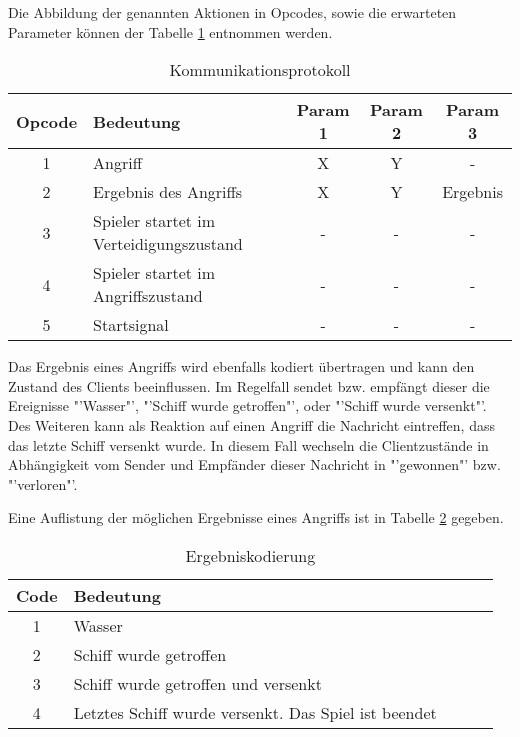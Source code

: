 Die Abbildung der genannten Aktionen in Opcodes, sowie die erwarteten Parameter können der Tabelle \ref{tbl:Kommunikationsprotokoll} entnommen werden.

\begin{table}[H]
	\centering
	\begin{tabular}{|c|l|c|c|c|}
		\hline
		\textbf{Opcode}	&	\textbf{Bedeutung}	&	\textbf{Param 1}	&	\textbf{Param 2}	&	\textbf{Param 3} \\
		\hline
		\hline
		1				&	Angriff				&	X						&	Y				&	-	\\
		\hline
		2				&	Ergebnis des Angriffs	&	X					&	Y				&	Ergebnis	\\
		\hline
		3				&	Spieler startet im Verteidigungszustand	&	-	&	-				&	-	\\
		\hline
		4				&	Spieler startet im Angriffszustand	&	-		&	-				&	-	\\
		\hline
		5				&	Startsignal			&	-						&	-				&	-	\\
		\hline
	\end{tabular}
	\caption{Kommunikationsprotokoll}
	\label{tbl:Kommunikationsprotokoll}
\end{table}

Das Ergebnis eines Angriffs wird ebenfalls kodiert übertragen und kann den Zustand des Clients beeinflussen.
Im Regelfall sendet bzw. empfängt dieser die Ereignisse "'Wasser"', "'Schiff wurde getroffen"', oder "'Schiff wurde versenkt"'.
Des Weiteren kann als Reaktion auf einen Angriff die Nachricht eintreffen, dass das letzte Schiff versenkt wurde.
In diesem Fall wechseln die Clientzustände in Abhängigkeit vom Sender und Empfänder dieser Nachricht in "'gewonnen"' bzw. "'verloren"'.

Eine Auflistung der möglichen Ergebnisse eines Angriffs ist in Tabelle \ref{tbl:Ergebniskodierung} gegeben.

\begin{table}[H]
	\centering
	\begin{tabular}{|c|l|c|c|c|}
		\hline
		\textbf{Code}	&	\textbf{Bedeutung} \\
		\hline
		\hline
		1				&	Wasser	\\
		\hline
		2				&	Schiff wurde getroffen	\\
		\hline
		3				&	Schiff wurde getroffen und versenkt	\\
		\hline
		4				&	Letztes Schiff wurde versenkt. Das Spiel ist beendet	\\
		\hline
	\end{tabular}
	\caption{Ergebniskodierung}
	\label{tbl:Ergebniskodierung}
\end{table}

